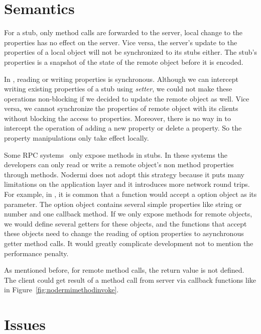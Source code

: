 \section{Semantics}



For a stub, only method calls are forwarded to the server,
local change to the properties has no effect on the server.
Vice versa, the server's update to the properties of a local object will 
not be synchronized to its stubs either.
The stub's properties is a snapshot of the state of 
the remote object before it is encoded.

In \js{}, reading or writing properties is synchronous.
Although we can intercept writing existing properties of a stub using
\emph{setter}, we could not make these operations non-blocking if we decided to update
the remote object as well.
Vice versa, we cannot synchronize the properties of remote object with its clients without
blocking the access to properties.
Moreover, there is no way in \js{} to intercept the operation of adding a new property or delete
a property.
So the property manipulations only take effect locally.

Some RPC systems~\cite{birrell1993distributed} only expose methods in stubs.
In these systems the developers can only read or write a remote object's
non method properties through methods.
Nodermi does not adopt this strategy because it puts many limitations on the
application layer and it introduces more network round trips.
For example, in \js{}, it is common that a function would accept
a option object as its parameter. 
The option object contains several simple properties like string or number 
and one callback method.
If we only expose methods for remote objects, we would define several getters 
for these objects, and the functions that accept these objects 
need to change the reading of option properties to asynchronous getter method calls.
It would greatly complicate development not to mention the performance penalty.


As mentioned before, for remote method calls, the return value is not defined.
The client could get result of a method call
from server via callback functions like in Figure~\ref{fig:nodermimethodinvoke}.




\section{Issues}

